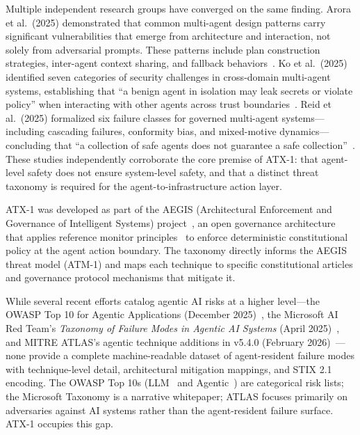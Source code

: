 \documentclass{IEEEoj-data}
\newcommand{\replaced}[2]{#1}
\begin{document}
Multiple independent research groups have converged on the same finding. \replaced{Arora et al.\ (2025) demonstrated that common multi-agent design patterns carry significant vulnerabilities that emerge from architecture and interaction, not solely from adversarial prompts. These patterns include plan construction strategies, inter-agent context sharing, and fallback behaviors~\mbox{\cite{ref11}}.}{Arora et al.\ (2025) demonstrated that common multi-agent design patterns---including plan construction strategies, inter-agent context sharing, and fallback behaviors---carry significant vulnerabilities that emerge from architecture and interaction, not solely from adversarial prompts~\mbox{\cite{ref11}}.} Ko et al.\ (2025) identified seven categories of security challenges in cross-domain multi-agent systems, establishing that ``a benign agent in isolation may leak secrets or violate policy'' when interacting with other agents across trust boundaries~\cite{ref12}. Reid et al.\ (2025) formalized six failure classes for governed multi-agent systems---including cascading failures, conformity bias, and mixed-motive dynamics---concluding that ``a collection of safe agents does not guarantee a safe collection''~\cite{ref13}. These studies independently corroborate the core premise of ATX-1: that agent-level safety does not ensure system-level safety, and that a distinct threat taxonomy is required for the agent-to-infrastructure action layer.

ATX-1 was developed as part of the AEGIS (Architectural Enforcement and Governance of Intelligent Systems) project~\cite{ref5}, an open governance architecture that applies reference monitor principles~\cite{ref14} to enforce deterministic constitutional policy at the agent action boundary. The taxonomy directly informs the AEGIS threat model (ATM-1) and maps each technique to specific constitutional articles and governance protocol mechanisms that mitigate it.

\replaced{While several recent efforts catalog agentic AI risks at a higher level---the OWASP Top 10 for Agentic Applications (December 2025)~\mbox{\cite{ref30}}, the Microsoft AI Red Team's {\it Taxonomy of Failure Modes in Agentic AI Systems} (April 2025)~\mbox{\cite{ref17}}, and MITRE ATLAS's agentic technique additions in v5.4.0 (February 2026)~\mbox{\cite{ref3}}---none provide a complete machine-readable dataset of agent-resident failure modes with technique-level detail, architectural mitigation mappings, and STIX 2.1 encoding. The OWASP Top 10s (LLM~\mbox{\cite{ref6}} and Agentic~\mbox{\cite{ref30}}) are categorical risk lists; the Microsoft Taxonomy is a narrative whitepaper; ATLAS focuses primarily on adversaries against AI systems rather than the agent-resident failure surface. ATX-1 occupies this gap.}{No comparable machine-readable dataset exists for agentic AI threat modeling. The OWASP Top 10 for LLM Applications~\mbox{\cite{ref6}} provides a high-level risk categorization but does not define individual techniques, map mitigations to architectural mechanisms, or provide STIX-compatible data for integration with threat intelligence platforms. ATX-1 fills this gap.}
\end{document}
